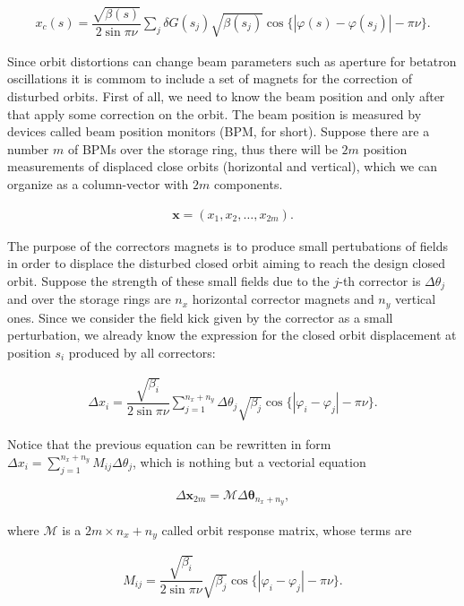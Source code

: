  \begin{align*}
 x_c(s) = \dfrac{\sqrt{\beta(s)}}{2\sin\pi\nu} \sum_j \delta G({s}_j) \sqrt{\beta({s}_j)}\cos\{ |\varphi(s) - \varphi({s}_j)| - \pi\nu \}.
 \end{align*}

 Since orbit distortions can change beam parameters such as aperture for betatron oscillations it is commom to include a set of magnets for the correction of disturbed orbits. First of all, we need to know the beam position and only after
 that apply some correction on the orbit. The beam position is measured by devices called beam position monitors (BPM, for short). Suppose there are a number $m$ of BPMs over the storage ring, thus there will be $2m$ position measurements of displaced close orbits (horizontal and vertical), which we can organize as a column-vector with $2m$ components.

 \begin{align*}
 \mathbf{x} = \left(x_1,x_2,\ldots,x_{2m}\right).
 \end{align*}

 The purpose of the correctors magnets is to produce small pertubations of fields in order to displace the disturbed closed orbit aiming to reach the design closed orbit. Suppose the strength of these small fields due to the $j$-th corrector is $\Delta \theta_j$ and over the storage rings are $n_x$ horizontal corrector magnets and $n_y$ vertical ones.
 Since we consider the field kick given by the corrector as a small perturbation, we already know the expression for the closed orbit displacement at position $s_i$ produced by all correctors:

 \begin{align*}
 \Delta x_i = \dfrac{\sqrt{\beta_i}}{2\sin\pi\nu} \sum_{j=1}^{n_x + n_y} \Delta \theta_j \sqrt{\beta_j}\cos\{ |\varphi_i - \varphi_j| - \pi\nu \}.
 \end{align*}

 Notice that the previous equation can be rewritten in form $\Delta x_i = \sum_{j=1}^{n_x + n_y}M_{ij}\Delta\theta_j$, which is nothing but a vectorial equation

 \begin{align*}
   \Delta \mathbf{x}_{2m} = \mathcal{M}\Delta \boldsymbol{\theta}_{n_x + n_y},
 \end{align*}

 where $\mathcal{M}$ is a $2m \times n_x + n_y$ called orbit response matrix, whose terms are

 \begin{align*}
M_{ij} = \dfrac{\sqrt{\beta_i}}{2\sin\pi\nu}\sqrt{\beta_j}\cos\{ |\varphi_i - \varphi_j| - \pi\nu \}.
\end{align*}

